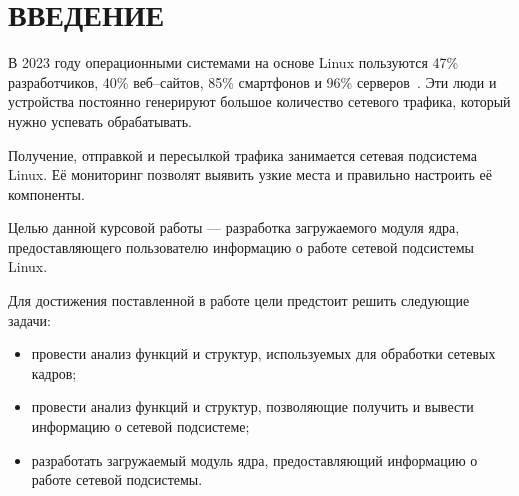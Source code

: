 \chapter*{ВВЕДЕНИЕ}

В 2023 году операционными системами на основе Linux пользуются 47\% разработчиков, 40\% веб--сайтов, 85\% смартфонов и 96\% серверов~\cite{stats}. Эти люди и устройства постоянно генерируют большое количество сетевого трафика, который нужно успевать обрабатывать.

Получение, отправкой и пересылкой трафика занимается сетевая подсистема Linux. Её мониторинг позволят выявить узкие места и правильно настроить её компоненты.

Целью данной курсовой работы --- разработка загружаемого модуля ядра, предоставляющего пользователю информацию о работе сетевой подсистемы Linux.

Для достижения поставленной в работе цели предстоит решить следующие задачи:
\begin{itemize}[label=---]
	\item провести анализ функций и структур, используемых для обработки сетевых кадров;
	\item провести анализ функций и структур, позволяющие получить и вывести информацию о сетевой подсистеме;
	\item разработать загружаемый модуль ядра, предоставляющий информацию о работе сетевой подсистемы.
\end{itemize}
